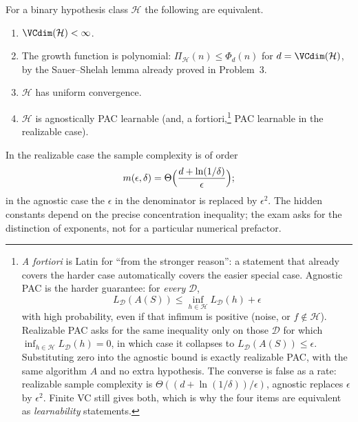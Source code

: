 \begin{theorem}
\label{thm:mlu-fundamental}
For a binary hypothesis class $\mathcal{H}$ the following are equivalent.
\begin{enumerate}[label=(\roman*)]
    \item $\VCdim(\mathcal{H})<\infty$.
    \item The growth function is polynomial: $\Pi_{\mathcal{H}}(n)\le\Phi_d(n)$ for $d=\VCdim(\mathcal{H})$, by the Sauer--Shelah lemma already proved in Problem~3.
    \item $\mathcal{H}$ has uniform convergence.
    \item $\mathcal{H}$ is agnostically PAC learnable (and, a fortiori,\footnote{\emph{A fortiori} is Latin for ``from the stronger reason'': a statement that already covers the harder case automatically covers the easier special case. Agnostic PAC is the harder guarantee: for \emph{every} $\mathcal{D}$,
\[
L_{\mathcal{D}}(A(S))\le\inf_{h\in\mathcal{H}}L_{\mathcal{D}}(h)+\epsilon
\]
with high probability, even if that infimum is positive (noise, or $f\notin\mathcal{H}$). Realizable PAC asks for the same inequality only on those $\mathcal{D}$ for which $\inf_{h\in\mathcal{H}}L_{\mathcal{D}}(h)=0$, in which case it collapses to $L_{\mathcal{D}}(A(S))\le\epsilon$. Substituting zero into the agnostic bound is exactly realizable PAC, with the same algorithm $A$ and no extra hypothesis. The converse is false as a rate: realizable sample complexity is $\Theta((d+\ln(1/\delta))/\epsilon)$, agnostic replaces $\epsilon$ by $\epsilon^2$. Finite VC still gives both, which is why the four items are equivalent as \emph{learnability} statements.} PAC learnable in the realizable case).
\end{enumerate}
In the realizable case the sample complexity is of order
\[
m(\epsilon,\delta)
=\Theta\Bigl(\frac{d+\ln(1/\delta)}{\epsilon}\Bigr);
\]
in the agnostic case the $\epsilon$ in the denominator is replaced by $\epsilon^2$. The hidden constants depend on the precise concentration inequality; the exam asks for the distinction of exponents, not for a particular numerical prefactor.
\end{theorem}


